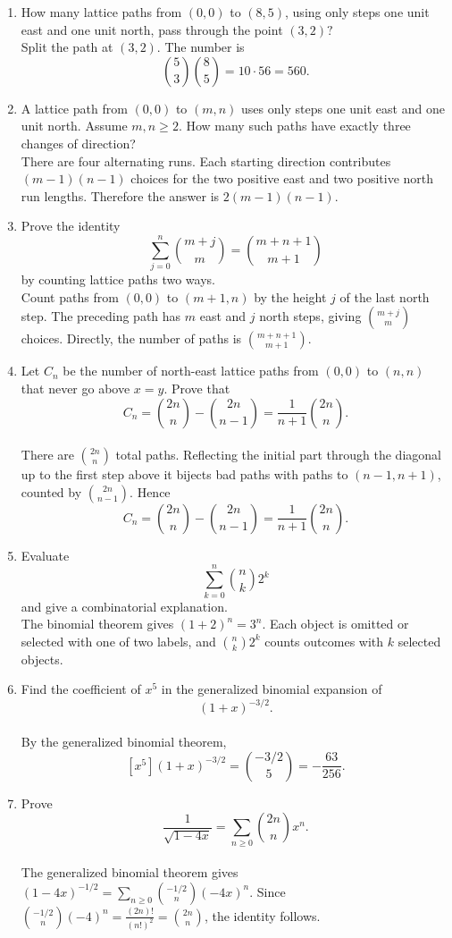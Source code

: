 \documentclass[11pt]{article}
\begin{document}
\begin{enumerate}
\item How many lattice paths from $(0,0)$ to $(8,5)$, using only steps one unit east and one unit north, pass through the point $(3,2)?$\\
  Split the path at $(3,2)$. The number is
\[
\binom{5}{3}\binom{8}{5}=10\cdot56=560.
\]
\item A lattice path from $(0,0)$ to $(m,n)$ uses only steps one unit east and one unit north. Assume $m,n\ge2$. How many such paths have exactly three changes of direction?\\
  There are four alternating runs. Each starting direction contributes $(m-1)(n-1)$ choices for the two positive east and two positive north run lengths. Therefore the answer is $2(m-1)(n-1)$.
\item Prove the identity
\[
\sum_{j=0}^{n}\binom{m+j}{m}=\binom{m+n+1}{m+1}
\]
by counting lattice paths two ways.\\
  Count paths from $(0,0)$ to $(m+1,n)$ by the height $j$ of the last north step. The preceding path has $m$ east and $j$ north steps, giving $\binom{m+j}{m}$ choices. Directly, the number of paths is $\binom{m+n+1}{m+1}$.
\item Let $C_n$ be the number of north-east lattice paths from $(0,0)$ to $(n,n)$ that never go above $x=y$. Prove that
\[
C_n=\binom{2n}{n}-\binom{2n}{n-1}=\frac{1}{n+1}\binom{2n}{n}.
\]\\
  There are $\binom{2n}{n}$ total paths. Reflecting the initial part through the diagonal up to the first step above it bijects bad paths with paths to $(n-1,n+1)$, counted by $\binom{2n}{n-1}$. Hence
\[
C_n=\binom{2n}{n}-\binom{2n}{n-1}=\frac{1}{n+1}\binom{2n}{n}.
\]
\item Evaluate
\[
\sum_{k=0}^{n}\binom{n}{k}2^k
\]
and give a combinatorial explanation.\\
  The binomial theorem gives $(1+2)^n=3^n$. Each object is omitted or selected with one of two labels, and $\binom nk2^k$ counts outcomes with $k$ selected objects.
\item Find the coefficient of $x^5$ in the generalized binomial expansion of
\[
(1+x)^{-3/2}.
\]\\
  By the generalized binomial theorem,
\[
[x^5](1+x)^{-3/2}=\binom{-3/2}{5}=-\frac{63}{256}.
\]
\item Prove
\[
\frac{1}{\sqrt{1-4x}}=\sum_{n\ge0}\binom{2n}{n}x^n.
\]\\
  The generalized binomial theorem gives $(1-4x)^{-1/2}=\sum_{n\ge0}\binom{-1/2}{n}(-4x)^n$. Since $\binom{-1/2}{n}(-4)^n=\frac{(2n)!}{(n!)^2}=\binom{2n}{n}$, the identity follows.
\end{enumerate}
\end{document}
